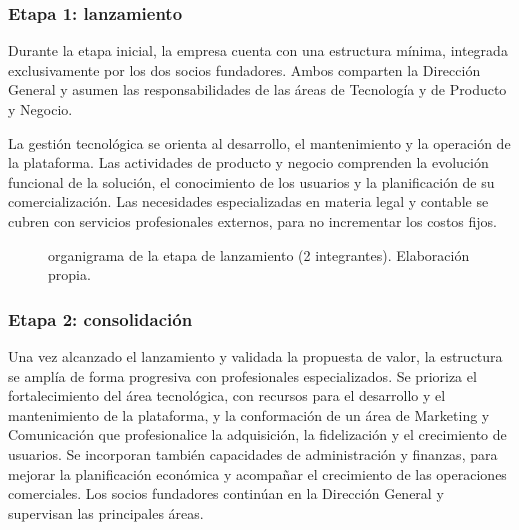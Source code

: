 \subsubsection{Etapa 1: lanzamiento}
Durante la etapa inicial, la empresa cuenta con una estructura mínima, integrada exclusivamente por los dos socios fundadores. Ambos comparten la Dirección General y asumen las responsabilidades de las áreas de Tecnología y de Producto y Negocio.

La gestión tecnológica se orienta al desarrollo, el mantenimiento y la operación de la plataforma. Las actividades de producto y negocio comprenden la evolución funcional de la solución, el conocimiento de los usuarios y la planificación de su comercialización. Las necesidades especializadas en materia legal y contable se cubren con servicios profesionales externos, para no incrementar los costos fijos.

\begin{figure}[htbp]
\centering
{}
\caption{organigrama de la etapa de lanzamiento (2 integrantes). Elaboración propia.}
\end{figure}

\subsubsection{Etapa 2: consolidación}
Una vez alcanzado el lanzamiento y validada la propuesta de valor, la estructura se amplía de forma progresiva con profesionales especializados. Se prioriza el fortalecimiento del área tecnológica, con recursos para el desarrollo y el mantenimiento de la plataforma, y la conformación de un área de Marketing y Comunicación que profesionalice la adquisición, la fidelización y el crecimiento de usuarios. Se incorporan también capacidades de administración y finanzas, para mejorar la planificación económica y acompañar el crecimiento de las operaciones comerciales. Los socios fundadores continúan en la Dirección General y supervisan las principales áreas.

